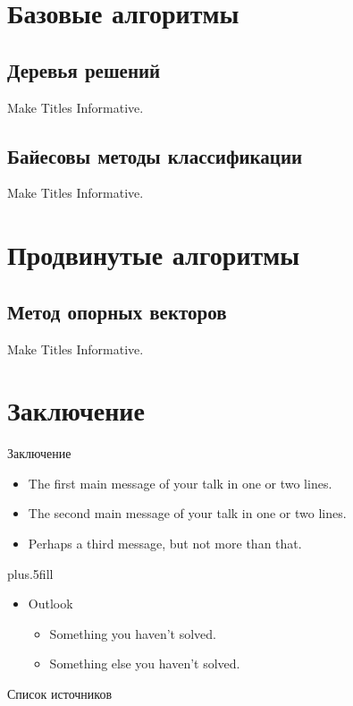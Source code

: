 \documentclass{beamer}
\begin{document}
\section{Базовые алгоритмы}
\subsection{Деревья решений}

\begin{frame}{Make Titles Informative.}
\end{frame}


\subsection{Байесовы методы классификации}

\begin{frame}{Make Titles Informative.}
\end{frame}

\section{Продвинутые алгоритмы}
\subsection{Метод опорных векторов}

\begin{frame}{Make Titles Informative.}
\end{frame}

\section{Заключение}

\begin{frame}{Заключение}

  \begin{itemize}
    \item
      The \alert{first main message} of your talk in one or two lines.
    \item
      The \alert{second main message} of your talk in one or two lines.
    \item
      Perhaps a \alert{third message}, but not more than that.
  \end{itemize}

  \vskip0pt plus.5fill
  \begin{itemize}
    \item
      Outlook
      \begin{itemize}
        \item
          Something you haven't solved.
        \item
          Something else you haven't solved.
      \end{itemize}
  \end{itemize}
\end{frame}

\begin{frame}[allowframebreaks]{Список источников} 
\end{frame}

\begin{frame}
  \titlepage
\end{frame}
\end{document}
